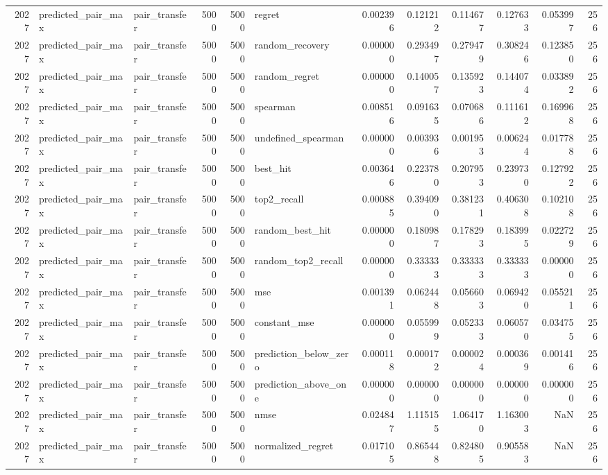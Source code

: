 \begin{tabular}{rllrrlrrrrrr}
2027 & predicted_pair_max & pair_transfer & 5000 & 5000 & regret & 0.002396 & 0.121212 & 0.114677 & 0.127633 & 0.053997 & 256 \\
2027 & predicted_pair_max & pair_transfer & 5000 & 5000 & random_recovery & 0.000000 & 0.293497 & 0.279479 & 0.308246 & 0.123850 & 256 \\
2027 & predicted_pair_max & pair_transfer & 5000 & 5000 & random_regret & 0.000000 & 0.140057 & 0.135923 & 0.144074 & 0.033892 & 256 \\
2027 & predicted_pair_max & pair_transfer & 5000 & 5000 & spearman & 0.008516 & 0.091635 & 0.070686 & 0.111612 & 0.169968 & 256 \\
2027 & predicted_pair_max & pair_transfer & 5000 & 5000 & undefined_spearman & 0.000000 & 0.003936 & 0.001953 & 0.006244 & 0.017788 & 256 \\
2027 & predicted_pair_max & pair_transfer & 5000 & 5000 & best_hit & 0.003646 & 0.223780 & 0.207953 & 0.239730 & 0.127922 & 256 \\
2027 & predicted_pair_max & pair_transfer & 5000 & 5000 & top2_recall & 0.000885 & 0.394090 & 0.381231 & 0.406308 & 0.102108 & 256 \\
2027 & predicted_pair_max & pair_transfer & 5000 & 5000 & random_best_hit & 0.000000 & 0.180987 & 0.178293 & 0.183995 & 0.022729 & 256 \\
2027 & predicted_pair_max & pair_transfer & 5000 & 5000 & random_top2_recall & 0.000000 & 0.333333 & 0.333333 & 0.333333 & 0.000000 & 256 \\
2027 & predicted_pair_max & pair_transfer & 5000 & 5000 & mse & 0.001391 & 0.062448 & 0.056603 & 0.069420 & 0.055211 & 256 \\
2027 & predicted_pair_max & pair_transfer & 5000 & 5000 & constant_mse & 0.000000 & 0.055999 & 0.052333 & 0.060570 & 0.034755 & 256 \\
2027 & predicted_pair_max & pair_transfer & 5000 & 5000 & prediction_below_zero & 0.000118 & 0.000172 & 0.000024 & 0.000369 & 0.001416 & 256 \\
2027 & predicted_pair_max & pair_transfer & 5000 & 5000 & prediction_above_one & 0.000000 & 0.000000 & 0.000000 & 0.000000 & 0.000000 & 256 \\
2027 & predicted_pair_max & pair_transfer & 5000 & 5000 & nmse & 0.024847 & 1.115155 & 1.064170 & 1.163003 & NaN & 256 \\
2027 & predicted_pair_max & pair_transfer & 5000 & 5000 & normalized_regret & 0.017105 & 0.865448 & 0.824805 & 0.905583 & NaN & 256 \\

\end{tabular}
